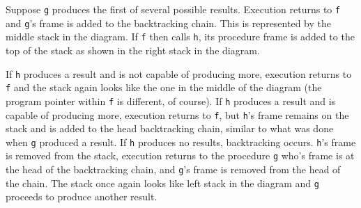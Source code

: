 {

\par}

Suppose \texttt{g} produces the first of several possible
results. Execution returns to \texttt{f} and \texttt{g}'s frame is
added to the backtracking chain. This is represented by the middle
stack in the diagram. If \texttt{f} then calls \texttt{h}, its
procedure frame is added to the top of the stack as shown in the right
stack in the diagram.

If \texttt{h} produces a result and is not capable of producing more,
execution returns to \texttt{f} and the stack again looks like the one
in the middle of the diagram (the program pointer within \texttt{f} is
different, of course). If \texttt{h} produces a result and is capable
of producing more, execution returns to \texttt{f}, but \texttt{h}'s
frame remains on the stack and is added to the head backtracking
chain, similar to what was done when \texttt{g} produced a result.
If \texttt{h} produces no results, backtracking occurs.  \texttt{h}'s
frame is removed from the stack, execution returns to the
procedure \texttt{g} who's frame is at the head of the backtracking
chain, and \texttt{g}'s frame is removed from the head of the
chain. The stack once again looks like left stack in the diagram
and \texttt{g} proceeds to produce another result.


